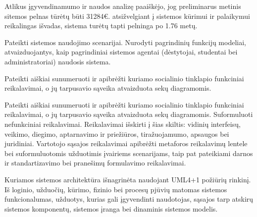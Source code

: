 \documentclass{VUMIFPSkursinis}
\begin{document}
Atlikus įgyvendinamumo ir naudos analizę paaiškėjo, jog preliminarus metinis sitemos pelnas tūrėtų būti 31284€. atsižvelgiant į sistemos kūrimui ir palaikymui reikalingas išvadas, sistema turėtų tapti pelninga po 1.76 metų.

Pateikti sistemos naudojimo scenarijai. Nurodyti pagrindinių funkcijų modeliai, atvaizduojantys, kaip pagrindiniai sistemos agentai (dėstytojai, studentai bei  administratoriai) naudosis sistema.

Pateikti aiškiai sunumeruoti ir apibrėžti kuriamo socialinio tinklapio funkciniai reikalavimai, o
jų tarpusavio sąveika atvaizduota sekų diagramomis.

Pateikti aiškiai sunumeruoti ir apibrėžti kuriamo socialinio tinklapio funkciniai reikalavimai, o
jų tarpusavio sąveika atvaizduota sekų diagramomis.
Suformuluoti nefunkciniai reikalavimai. Reikalavimai išskirti į šias skiltis: vidinių interfeisų,
veikimo, diegimo, aptarnavimo ir priežiūros, tiražuojamumo, apsaugos bei juridiniai.
Vartotojo sąsajos reikalavimai apibrėžti metaforos reikalavimų lentele bei suformuluotomis užduotimis
įvairiems scenarijams, taip pat pateikiami darnos ir standartizavimo bei pranešimų formulavimo
reikalavimai.

Kuriamos sistemos architektūra išnagrinėta naudojant UML4+1 požiūrių rinkinį. Iš loginio, užduočių, kūrimo, fizinio bei procesų pjūvių matomas sistemos funkcionalumas, užduotys, kurias gali įgyvendinti naudotojas, sąsajos tarp atskirų sistemos komponentų, sistemos įranga bei dinaminis sistemos modelis.
\end{document}
